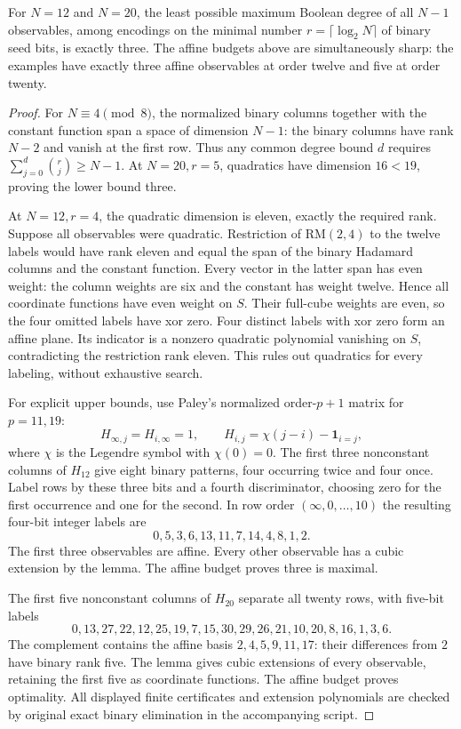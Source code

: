 \begin{theorem}
\label{thm:nonlinear-cubic}
For $N=12$ and $N=20$, the least possible maximum Boolean degree of
all $N-1$ observables, among encodings on the minimal number
$r=\lceil\log_2N\rceil$ of binary seed bits, is exactly three.
The affine budgets above are simultaneously sharp: the examples have
exactly three affine observables at order twelve and five at order twenty.
\end{theorem}
\begin{proof}
For $N\equiv4\pmod8$, the normalized binary columns together with the
constant function span a space of dimension $N-1$: the binary columns
have rank $N-2$ and vanish at the first row. Thus any common degree
bound $d$ requires
$\sum_{j=0}^d\binom rj\ge N-1$.
At $N=20,r=5$, quadratics have dimension $16<19$, proving the lower
bound three.

At $N=12,r=4$, the quadratic dimension is eleven, exactly the required
rank. Suppose all observables were quadratic. Restriction of
$\mathrm{RM}(2,4)$ to the twelve labels would have rank eleven and equal
the span of the binary Hadamard columns and the constant function.
Every vector in the latter span has even weight: the column weights
are six and the constant has weight twelve. Hence all coordinate
functions have even weight on $S$. Their full-cube weights are even,
so the four omitted labels have xor zero. Four distinct labels with xor
zero form an affine plane. Its indicator is a nonzero quadratic
polynomial vanishing on $S$, contradicting the restriction rank eleven.
This rules out quadratics for every labeling, without exhaustive search.

For explicit upper bounds, use Paley's normalized order-$p+1$ matrix
for $p=11,19$:
\[
 H_{\infty,j}=H_{i,\infty}=1,\qquad
 H_{i,j}=\chi(j-i)-\mathbf1_{i=j},
\]
where $\chi$ is the Legendre symbol with $\chi(0)=0$.
The first three nonconstant columns of $H_{12}$ give eight binary
patterns, four occurring twice and four once. Label rows by these
three bits and a fourth discriminator, choosing zero for the first
occurrence and one for the second. In row order $(\infty,0,\ldots,10)$
the resulting four-bit integer labels are
\[
 0,5,3,6,13,11,7,14,4,8,1,2.
\]
The first three observables are affine. Every other observable has a
cubic extension by the lemma. The affine budget proves three is maximal.

The first five nonconstant columns of $H_{20}$ separate all twenty
rows, with five-bit labels
\[
 0,13,27,22,12,25,19,7,15,30,29,26,21,10,20,8,16,1,3,6.
\]
The complement contains the affine basis
$2,4,5,9,11,17$: their differences from $2$ have binary rank five.
The lemma gives cubic extensions of every observable, retaining the
first five as coordinate functions. The affine budget proves optimality.
All displayed finite certificates and extension polynomials are checked
by original exact binary elimination in the accompanying script.
\end{proof}

